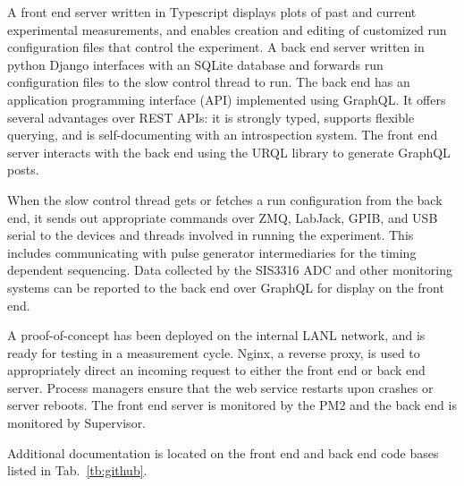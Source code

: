 A front end server written in Typescript displays plots of past and current experimental measurements, and enables creation and editing of customized run configuration files that control the experiment. A back end server written in python Django interfaces with an SQLite database and forwards run configuration files to the slow control thread to run. The back end has an application programming interface (API) implemented using GraphQL. It offers several advantages over REST APIs: it is strongly typed, supports flexible querying, and is self-documenting with an introspection system. The front end server interacts with the back end using the URQL library to generate GraphQL posts.

When the slow control thread gets or fetches a run configuration from the back end, it sends out appropriate commands over ZMQ, LabJack, GPIB, and USB serial to the devices and threads involved in running the experiment. This includes communicating with pulse generator intermediaries for the timing dependent sequencing. Data collected by the SIS3316 ADC and other monitoring systems can be reported to the back end over GraphQL for display on the front end.

A proof-of-concept has been deployed on the internal LANL network, and is ready for testing in a measurement cycle. Nginx, a reverse proxy, is used to appropriately direct an incoming request to either the front end or back end server. Process managers ensure that the web service restarts upon crashes or server reboots. The front end server is monitored by the PM2 and the back end is monitored by Supervisor.

Additional documentation is located on the front end and back end code bases listed in Tab.~\ref{tb:github}.